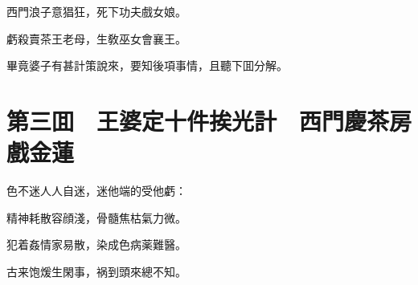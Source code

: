 西門浪子意猖狂，死下功夫戲女娘。

虧殺賣茶王老母，生敎巫女會襄王。

畢竟婆子有甚計策說來，要知後項事情，且聽下囬分解。

\chapter*{第三囬　王婆定十件挨光計　西門慶茶房戲金蓮}

色不迷人人自迷，迷他端的受他虧：

精神耗散容顔淺，骨髓焦枯氣力微。

犯着姦情家易散，染成色病薬難醫。

古来饱煖生閑事，祸到頭來總不知。

